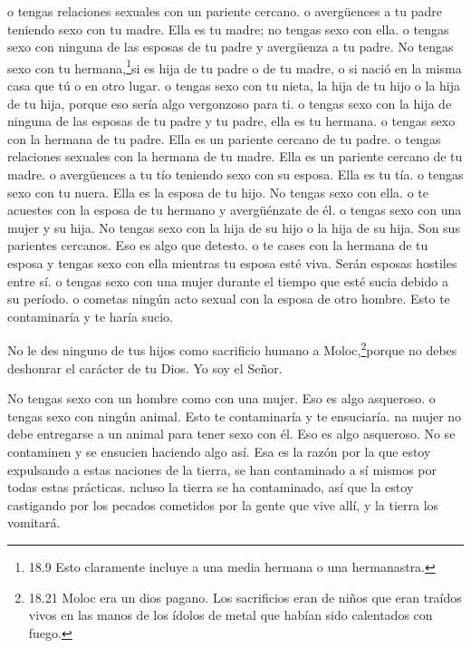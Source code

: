 o tengas relaciones sexuales con un pariente cercano.
 o avergüences a tu padre teniendo sexo con tu madre. Ella
es tu madre; no tengas sexo con ella.  o tengas sexo con
ninguna de las esposas de tu padre y avergüenza a tu padre. 
No tengas sexo con tu hermana,\footnote{18.9 Esto claramente incluye a
  una media hermana o una hermanastra.}si es hija de tu padre o de tu
madre, o si nació en la misma casa que tú o en otro lugar. 
o tengas sexo con tu nieta, la hija de tu hijo o la hija de tu hija,
porque eso sería algo vergonzoso para ti.  o tengas sexo
con la hija de ninguna de las esposas de tu padre y tu padre, ella es tu
hermana.  o tengas sexo con la hermana de tu padre. Ella es
un pariente cercano de tu padre.  o tengas relaciones
sexuales con la hermana de tu madre. Ella es un pariente cercano de tu
madre.  o avergüences a tu tío teniendo sexo con su esposa.
Ella es tu tía.  o tengas sexo con tu nuera. Ella es la
esposa de tu hijo. No tengas sexo con ella.  o te acuestes
con la esposa de tu hermano y avergüénzate de él.  o tengas
sexo con una mujer y su hija. No tengas sexo con la hija de su hijo o la
hija de su hija. Son sus parientes cercanos. Eso es algo que detesto.
 o te cases con la hermana de tu esposa y tengas sexo con
ella mientras tu esposa esté viva. Serán esposas hostiles entre sí.
 o tengas sexo con una mujer durante el tiempo que esté
sucia debido a su período.  o cometas ningún acto sexual
con la esposa de otro hombre. Esto te contaminaría y te haría sucio.

 No le des ninguno de tus hijos como sacrificio humano a
Moloc,\footnote{18.21 Moloc era un dios pagano. Los sacrificios eran de
  niños que eran traídos vivos en las manos de los ídolos de metal que
  habían sido calentados con fuego.}porque no debes deshonrar el
carácter de tu Dios. Yo soy el Señor.

 No tengas sexo con un hombre como con una mujer. Eso es
algo asqueroso.  o tengas sexo con ningún animal. Esto te
contaminaría y te ensuciaría.  na mujer no debe entregarse
a un animal para tener sexo con él. Eso es algo asqueroso. No se
contaminen y se ensucien haciendo algo así. Esa es la razón por la que
estoy expulsando a estas naciones de la tierra, se han contaminado a sí
mismos por todas estas prácticas.  ncluso la tierra se ha
contaminado, así que la estoy castigando por los pecados cometidos por
la gente que vive allí, y la tierra los vomitará.

